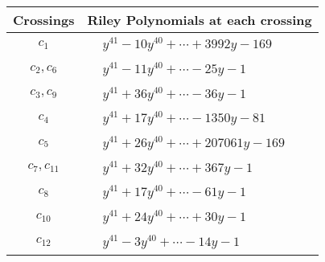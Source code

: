 \documentclass[1p]{elsarticle_modified}
\theoremstyle{definition}
\begin{document}
\begin{tabular}{m{50pt}|m{274pt}}
Crossings & \hspace{64pt}Riley Polynomials at each crossing \\
\hline $$\begin{aligned}c_{1}\end{aligned}$$&$\begin{aligned}
&y^{41}-10 y^{40}+\cdots+3992 y-169
\end{aligned}$\\
\hline $$\begin{aligned}c_{2},c_{6}\end{aligned}$$&$\begin{aligned}
&y^{41}-11 y^{40}+\cdots-25 y-1
\end{aligned}$\\
\hline $$\begin{aligned}c_{3},c_{9}\end{aligned}$$&$\begin{aligned}
&y^{41}+36 y^{40}+\cdots-36 y-1
\end{aligned}$\\
\hline $$\begin{aligned}c_{4}\end{aligned}$$&$\begin{aligned}
&y^{41}+17 y^{40}+\cdots-1350 y-81
\end{aligned}$\\
\hline $$\begin{aligned}c_{5}\end{aligned}$$&$\begin{aligned}
&y^{41}+26 y^{40}+\cdots+207061 y-169
\end{aligned}$\\
\hline $$\begin{aligned}c_{7},c_{11}\end{aligned}$$&$\begin{aligned}
&y^{41}+32 y^{40}+\cdots+367 y-1
\end{aligned}$\\
\hline $$\begin{aligned}c_{8}\end{aligned}$$&$\begin{aligned}
&y^{41}+17 y^{40}+\cdots-61 y-1
\end{aligned}$\\
\hline $$\begin{aligned}c_{10}\end{aligned}$$&$\begin{aligned}
&y^{41}+24 y^{40}+\cdots+30 y-1
\end{aligned}$\\
\hline $$\begin{aligned}c_{12}\end{aligned}$$&$\begin{aligned}
&y^{41}-3 y^{40}+\cdots-14 y-1
\end{aligned}$\\
\hline
\end{tabular}\\~\\
\end{document}
